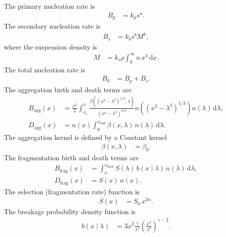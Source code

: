 \documentclass{article}
\begin{document}
The primary nucleation rate is
\begin{align}
    B_{p}
    &= k_{p} s^{u}.
\end{align}
The secondary nucleation rate is
\begin{align}
    B_{s}
    &= k_{b} s^{b} M^{k},
\end{align}
where the suspension density is
\begin{align}
    M
    &= k_{v} \rho \int_{0}^{\infty} n \, x^{3} \, \mathrm{d}x.
\end{align}
The total nucleation rate is
\begin{align}
    B_{0}
    &= B_{p}
        + B_{s}.
\end{align}
The aggregation birth and death terms are
\begin{align}
    B_{\mathrm{agg}}(x)
    &= \frac{x^{2}}{2} \int_{x_{c}}^{x} \frac{\beta\!\left((x^{3} - \lambda^{3})^{1/3}, \lambda\right)}{(x^{3} - \lambda^{3})^{2/3}} n\!\left((x^{3} - \lambda^{3})^{1/3}\right) n(\lambda) \, \mathrm{d}\lambda,
    \\
    D_{\mathrm{agg}}(x)
    &= n(x) \int_{0}^{x_{\mathrm{end}}} \beta(x, \lambda) \, n(\lambda) \, \mathrm{d}\lambda.
\end{align}
The aggregation kernel is defined by a Constant kernel
\begin{align}
    \beta(x, \lambda)
    &= \beta_{0}.
\end{align}
The fragmentation birth and death terms are
\begin{align}
    B_{\mathrm{frag}}(x)
    &= \int_{x}^{x_{\mathrm{max}}} S(\lambda) \, b(x \mid \lambda) \, n(\lambda) \, \mathrm{d}\lambda,
    \\
    D_{\mathrm{frag}}(x)
    &= S(x) \, n(x).
\end{align}
The selection (fragmentation rate) function is
\begin{align}
    S(x)
    &= S_{0} \, x^{3\alpha}.
\end{align}
The breakage probability density function is
\begin{align}
    b(x \mid \lambda)
    &= 3 x^{2} \frac{\gamma}{\lambda^{3}} \left( \frac{x^{3}}{\lambda^{3}} \right)^{\gamma - 2}.
\end{align}
\end{document}
